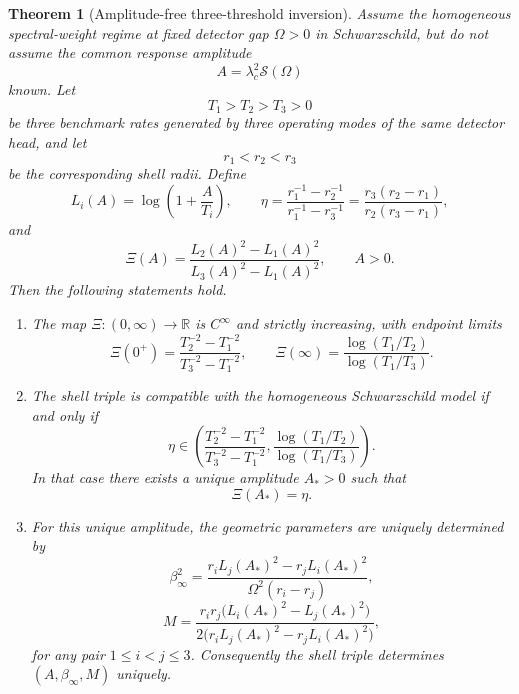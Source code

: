 \documentclass[11pt]{article}
\newtheorem{theorem}{Theorem}[section]
\theoremstyle{definition}
\newcommand{\RR}{\mathbb{R}}
\begin{document}
\begin{theorem}[Amplitude-free three-threshold inversion]\label{thm:three-threshold-main}
Assume the homogeneous spectral-weight regime at fixed detector gap $\Omega>0$ in Schwarzschild, but do not assume the common response amplitude
\[
A=\lambda_c^2\mathcal S(\Omega)
\]
known. Let
\[
T_1>T_2>T_3>0
\]
be three benchmark rates generated by three operating modes of the same detector head, and let
\[
r_1<r_2<r_3
\]
be the corresponding shell radii. Define
\[
L_i(A)=\log\!\left(1+\frac{A}{T_i}\right),
\qquad
\eta=
\frac{r_1^{-1}-r_2^{-1}}{r_1^{-1}-r_3^{-1}}
=
\frac{r_3(r_2-r_1)}{r_2(r_3-r_1)},
\]
and
\[
\Xi(A)=
\frac{L_2(A)^2-L_1(A)^2}{L_3(A)^2-L_1(A)^2},
\qquad A>0.
\]
Then the following statements hold.
\begin{enumerate}[label=\textup{(\roman*)},leftmargin=2.2em,itemsep=0.25em]
\item The map $\Xi:(0,\infty)\to\RR$ is $C^\infty$ and strictly increasing, with endpoint limits
\begin{equation}\label{eq:Xi-limits-main}
\Xi(0^+)=
\frac{T_2^{-2}-T_1^{-2}}{T_3^{-2}-T_1^{-2}},
\qquad
\Xi(\infty)=
\frac{\log(T_1/T_2)}{\log(T_1/T_3)}.
\end{equation}
\item The shell triple is compatible with the homogeneous Schwarzschild model if and only if
\begin{equation}\label{eq:Xi-compatibility-main}
\eta\in
\left(
\frac{T_2^{-2}-T_1^{-2}}{T_3^{-2}-T_1^{-2}},
\frac{\log(T_1/T_2)}{\log(T_1/T_3)}
\right).
\end{equation}
In that case there exists a unique amplitude $A_\ast>0$ such that
\begin{equation}\label{eq:Xi-eq-main}
\Xi(A_\ast)=\eta.
\end{equation}
\item For this unique amplitude, the geometric parameters are uniquely determined by
\begin{equation}\label{eq:beta-infty-three-main}
\beta_\infty^2=
\frac{r_iL_j(A_\ast)^2-r_jL_i(A_\ast)^2}
{\Omega^2(r_i-r_j)},
\end{equation}
\begin{equation}\label{eq:mass-three-main}
M=
\frac{r_ir_j\bigl(L_i(A_\ast)^2-L_j(A_\ast)^2\bigr)}
{2\bigl(r_iL_j(A_\ast)^2-r_jL_i(A_\ast)^2\bigr)},
\end{equation}
for any pair $1\le i<j\le3$. Consequently the shell triple determines $(A,\beta_\infty,M)$ uniquely.
\end{enumerate}
\end{theorem}
\end{document}
